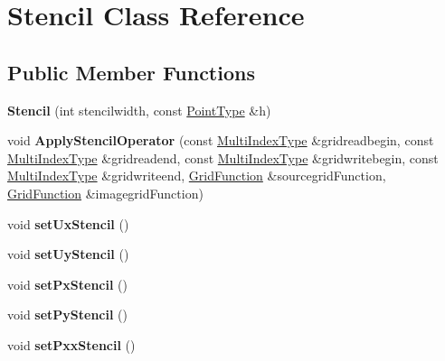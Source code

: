 \hypertarget{classStencil}{\section{Stencil Class Reference}
\label{classStencil}
}
\subsection*{Public Member Functions}
\begin{DoxyCompactItemize}
\item 
\hypertarget{classStencil_a0d9be2b06dc061f3db6f5cb1b9eb4047}{{\bfseries Stencil} (int stencilwidth, const \hyperlink{classArray}{Point\-Type} \&h)}\label{classStencil_a0d9be2b06dc061f3db6f5cb1b9eb4047}

\item 
\hypertarget{classStencil_a448e7606ce3d356e7ea88f6043a0327e}{void {\bfseries Apply\-Stencil\-Operator} (const \hyperlink{classArray}{Multi\-Index\-Type} \&gridreadbegin, const \hyperlink{classArray}{Multi\-Index\-Type} \&gridreadend, const \hyperlink{classArray}{Multi\-Index\-Type} \&gridwritebegin, const \hyperlink{classArray}{Multi\-Index\-Type} \&gridwriteend, \hyperlink{classGridFunction}{Grid\-Function} \&sourcegrid\-Function, \hyperlink{classGridFunction}{Grid\-Function} \&imagegrid\-Function)}\label{classStencil_a448e7606ce3d356e7ea88f6043a0327e}

\item 
\hypertarget{classStencil_a3b339acd31df97458e31882e752f3f41}{void {\bfseries set\-Ux\-Stencil} ()}\label{classStencil_a3b339acd31df97458e31882e752f3f41}

\item 
\hypertarget{classStencil_a47dfd59b69103c4edf96639432a3a30f}{void {\bfseries set\-Uy\-Stencil} ()}\label{classStencil_a47dfd59b69103c4edf96639432a3a30f}

\item 
\hypertarget{classStencil_a1c51b1b3aa6f08806c1a257ac219c7e5}{void {\bfseries set\-Px\-Stencil} ()}\label{classStencil_a1c51b1b3aa6f08806c1a257ac219c7e5}

\item 
\hypertarget{classStencil_a0244873531487b090cf3a067a10b6963}{void {\bfseries set\-Py\-Stencil} ()}\label{classStencil_a0244873531487b090cf3a067a10b6963}

\item 
\hypertarget{classStencil_a34e54951517bf5ea3bd3f8f111bf9949}{void {\bfseries set\-Pxx\-Stencil} ()}\label{classStencil_a34e54951517bf5ea3bd3f8f111bf9949}


\end{DoxyCompactItemize}
